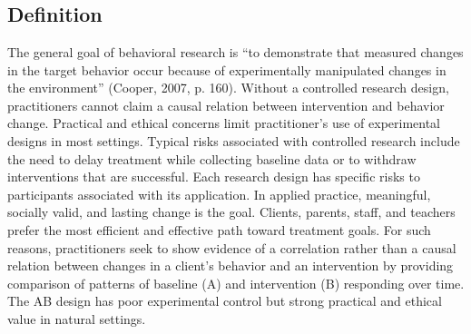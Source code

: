 \clearpage \section[\fourjNine{}]{\fourjNine{}%
              }
\subsection{Definition}
The general goal of behavioral research is ``to demonstrate that measured changes in the target behavior occur because of experimentally manipulated changes in the environment'' (Cooper, 2007, p. 160). Without a controlled research design, practitioners cannot claim a causal relation between intervention and behavior change. Practical and ethical concerns limit practitioner's use of experimental designs in most settings. Typical risks associated with controlled research include the need to delay treatment while collecting baseline data or to withdraw interventions that are successful. Each research design has specific risks to participants associated with its application. In applied practice, meaningful, socially valid, and lasting change is the goal. Clients, parents, staff, and teachers prefer the most efficient and effective path toward treatment goals. For such reasons, practitioners seek to show evidence of a correlation rather than a causal relation between changes in a client's behavior and an intervention by providing comparison of patterns of baseline (A) and intervention (B) responding over time. The AB design has poor experimental control but strong practical and ethical value in natural settings.
%
